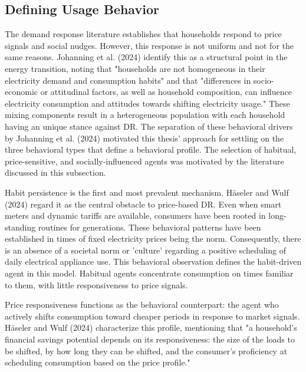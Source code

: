 \documentclass[11pt, a4paper]{article}
\begin{document}
\subsection{Defining Usage Behavior} \label{subs:userbehav}
The demand response literature establishes that households respond to price signals and social nudges. However, this response is not uniform and not for the same reasons. Johanning et al. (2024) identify this as a structural point in the energy transition, noting that "households are not homogeneous in their electricity demand and consumption habits" and that "differences in socio-economic or attitudinal factors, as well as household composition, can influence electricity consumption and attitudes towards shifting electricity usage." These mixing components result in a heterogeneous population with each household having an unique stance against DR. The separation of these behavioral drivers by Johanning et al. (2024) motivated this thesis' approach for settling on the three behavioral types that define a behavioral profile. The selection of habitual, price-sensitive, and socially-influenced agents was motivated by the literature discussed in this subsection.

Habit persistence is the first and most prevalent mechanism. Häseler and Wulf (2024) regard it as the central obstacle to price-based DR. Even when smart meters and dynamic tariffs are available, consumers have been rooted in long-standing routines for generations. These behavioral patterns have been established in times of fixed electricity prices being the norm. Consequently, there is an absence of a societal norm or 'culture' regarding a positive scheduling of daily electrical appliance use. This behavioral observation defines the habit-driven agent in this model. Habitual agents concentrate consumption on times familiar to them, with little responsiveness to price signals.

Price responsiveness functions as the behavioral counterpart: the agent who actively shifts consumption toward cheaper periods in response to market signals. Häseler and Wulf (2024) characterize this profile, mentioning that "a household's financial savings potential depends on its responsiveness: the size of the loads to be shifted, by how long they can be shifted, and the consumer's proficiency at scheduling consumption based on the price profile."
\end{document}

